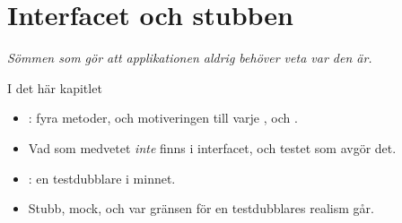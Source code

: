 \chapter{Interfacet och stubben}
\label{ch:interface}


{\large\itshape Sömmen som gör att applikationen aldrig behöver veta var den är.\par}

\begin{chapterbox}{I det här kapitlet}
\begin{itemize}
  \item {}: fyra metoder, och motiveringen till varje ,
     och \code{[[nodiscard]]}.
  \item Vad som medvetet \emph{inte} finns i interfacet, och testet som avgör det.
  \item {}: en testdubblare i minnet.
  \item Stubb, mock, och var gränsen för en testdubblares realism går.
\end{itemize}
\end{chapterbox}





